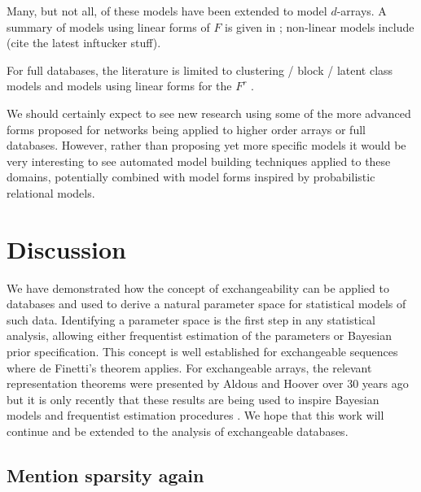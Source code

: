 Many, but not all, of these models have been extended to model $d$-arrays.
A summary of models using linear forms of $F$ is given in \cite{Kolda2009-ba}; non-linear models include \cite{Xu2012} (cite the latest inftucker stuff).

For full databases, the literature is limited to clustering / block / latent class models \cite{Kemp2006}  and models using linear forms for the $F^r$ \citep[e.g.][]{Acar, Acar2012, Acar2013, Andersen2013, Davison, Ermis1958, Gallinari2011, Jimeng2009, Kong2010, Lippert2008, Networks, Nickel2011, Shangguan2012, Singh, Singha, Singh2008}.

We should certainly expect to see new research using some of the more advanced forms proposed for networks being applied to higher order arrays or full databases.
However, rather than proposing yet more specific models it would be very interesting to see automated model building techniques applied to these domains, potentially combined with model forms inspired by probabilistic relational models.

\section{Discussion}

We have demonstrated how the concept of exchangeability can be applied to databases and used to derive a natural parameter space for statistical models of such data.
Identifying a parameter space is the first step in any statistical analysis, allowing either frequentist estimation of the parameters or Bayesian prior specification.
This concept is well established for exchangeable sequences where de Finetti's theorem \citep[e.g.][]{Kallenberg2005} applies.
For exchangeable arrays, the relevant representation theorems were presented by Aldous and Hoover \cite{Aldous1981a, Hoover1979} over 30 years ago but it is only recently that these results are being used to inspire Bayesian models \cite{Hoff2007a, Roy2009, Lloyd2012} and frequentist estimation procedures \cite{Kallenberg1999a,Choi2012, Wolfe2013}.
We hope that this work will continue and be extended to the analysis of exchangeable databases.

\subsection{Mention sparsity again}


\outbpdocument{


}
